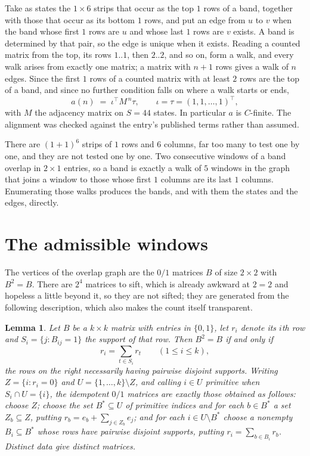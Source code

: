 \documentclass[11pt,a4paper]{article}
\theoremstyle{plain}
\newtheorem{lemma}[theorem]{Lemma}
\theoremstyle{definition}
\begin{document}
Take as states the $1\times6$ strips that occur as the top $1$ rows of a band,
together with those that occur as its bottom $1$ rows, and put an edge from $u$ to $v$
when the band whose first $1$ rows are $u$ and whose last $1$ rows are $v$ exists.
A band is determined by that pair, so the edge is unique when it exists. Reading a counted
matrix from the top, its rows $1..1$, then $2..2$, and so on, form a walk, and every
walk arises from exactly one matrix; a matrix with $n+1$ rows gives a walk of $n$ edges.
Since the first $1$ rows of a counted matrix with at least $2$ rows are the top of a
band, and since no further condition falls on where a walk starts or ends,
\[
a(n)\;=\;\iota^{\!\top}M^{\,n}\tau ,\qquad \iota=\tau=(1,1,\dots,1)^{\!\top},
\]
with $M$ the adjacency matrix on $S=44$ states. In particular $a$ is $C$-finite. The
alignment was checked against the entry's published terms rather than assumed.

There are $(1 + 1)^{6}$ strips of $1$ rows and $6$ columns, far too
many to test one by one, and they are not tested one by one. Two consecutive windows of a band
overlap in $2\times1$ entries, so a band is exactly a walk of $5$ windows in
the graph that joins a window to those whose first $1$ columns are its last $1$
columns. Enumerating those walks produces the bands, and with them the states and the edges,
directly.

\section{The admissible windows}

The vertices of the overlap graph are the $0/1$ matrices $B$ of size $2\times2$ with
$B^2=B$. There are $2^{4}$ matrices to sift, which is already awkward at $2=2$ and
hopeless a little beyond it, so they are not sifted; they are generated from the following
description, which also makes the count itself transparent.

\begin{lemma}\label{lem:idem}
Let $B$ be a $k\times k$ matrix with entries in $\{0,1\}$, let $r_i$ denote its $i$th row and
$S_i=\{j:B_{ij}=1\}$ the support of that row. Then $B^2=B$ if and only if
\[
r_i=\sum_{t\in S_i}r_t \qquad (1\le i\le k),
\]
the rows on the right necessarily having pairwise disjoint supports. Writing
$Z=\{i:r_i=0\}$ and $U=\{1,\dots,k\}\setminus Z$, and calling $i\in U$ \emph{primitive}
when $S_i\cap U=\{i\}$, the idempotent $0/1$ matrices are exactly those obtained as follows:
choose $Z$; choose the set $B^{\ast}\subseteq U$ of primitive indices and for each
$b\in B^{\ast}$ a set $Z_b\subseteq Z$, putting $r_b=e_b+\sum_{j\in Z_b}e_j$; and for each
$i\in U\setminus B^{\ast}$ choose a nonempty $B_i\subseteq B^{\ast}$ whose rows have
pairwise disjoint supports, putting $r_i=\sum_{b\in B_i}r_b$. Distinct data give distinct
matrices.
\end{lemma}
\end{document}
